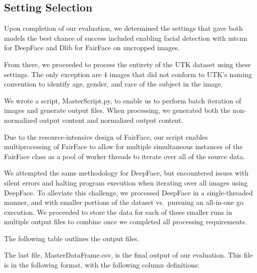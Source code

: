 \documentclass[
  letterpaper,
  DIV=11,
  numbers=noendperiod]{scrreprt}
\begin{document}
\hypertarget{setting-selection}{%
\subsection{Setting Selection}\label{setting-selection}}

Upon completion of our evaluation, we determined the settings that gave
both models the best chance of success included enabling facial
detection with mtcnn for DeepFace and Dlib for FairFace on uncropped
images.

From there, we proceeded to process the entirety of the UTK dataset
using these settings. The only exception are 4 images that did not
conform to UTK's naming convention to identify age, gender, and race of
the subject in the image.

We wrote a script, MasterScript.py, to enable us to perform batch
iteration of images and generate output files. When processing, we
generated both the non-normalized output content and normalized output
content.

Due to the resource-intensive design of FairFace, our script enables
multiprocessing of FairFace to allow for multiple simultaneous instances
of the FairFace class as a pool of worker threads to iterate over all of
the source data.

We attempted the same methodology for DeepFace, but encountered issues
with silent errors and halting program execution when iterating over all
images using DeepFace. To alleviate this challenge, we processed
DeepFace in a single-threaded manner, and with smaller portions of the
dataset vs.~pursuing an all-in-one go execution. We proceeded to store
the data for each of these smaller runs in multiple output files to
combine once we completed all processing requirements.

The following table outlines the output files.

The last file, MasterDataFrame.csv, is the final output of our
evaluation. This file is in the following format, with the following
column definitions:
\end{document}
